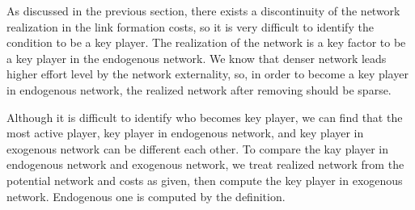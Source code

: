\documentclass[12pt]{article}
\theoremstyle{definition}
\begin{document}
As discussed in the previous section, there exists a discontinuity of the network realization in the link formation costs, so it is very difficult to identify the condition to be a key player.
The realization of the network is a key factor to be a key player in the endogenous network.
We know that denser network leads higher effort level by the network externality, so, in order to become a key player in endogenous network, the realized network after removing should be sparse.

Although it is difficult to identify who becomes key player, we can find that the most active player, key player in endogenous network, and key player in exogenous network can be different each other.
To compare the kay player in endogenous network and exogenous network, we treat realized network from the potential network and costs as given, then compute the key player in exogenous network.
Endogenous one is computed by the definition.
\end{document}
